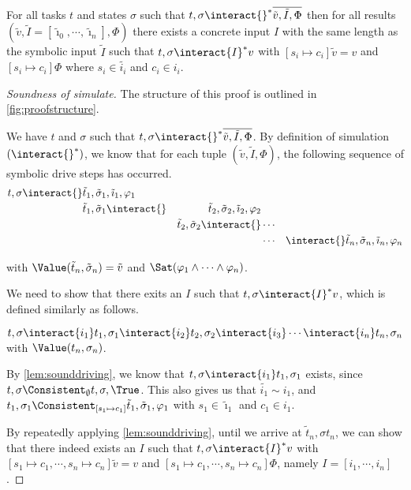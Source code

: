 \begin{lemma}
  \label{lem:soundsimulate}
  For all tasks $t$ and states $\sigma$
  such that $t,\sigma\interact{}^*\overline{\tilde{v},\tilde{I},\Phi}$
  then for all results $(\tilde{v},\tilde{I}=[\tilde{\imath}_0,\cdots,\tilde{\imath}_n],\Phi)$
  there exists a concrete input $I$ with the same length as the symbolic input $\tilde{I}$
  such that $t,\sigma\interact{I}^*v$
  with $[s_i\mapsto c_i]\tilde{v}=v$ and $[s_i\mapsto c_i]\Phi$
  where $s_i\in\tilde{i_i}$ and $c_i\in i_i$.
\end{lemma}

\begin{proof}[Soundness of simulate]
  The structure of this proof is outlined in \cref{fig:proofstructure}.

  We have $t$ and $\sigma$ such that $t,\sigma\interact{}^*\overline{\tilde{v},\tilde{I},\Phi}$.
  By definition of simulation $(\interact{}^*)$, we know that for each tuple $(\tilde{v},\tilde{I},\Phi)$,
  the following sequence of symbolic drive steps has occurred.
  \begin{align*}
      t,\sigma\interact{}&\tilde{t}_1,\tilde{\sigma}_1,\tilde{\imath}_1,\phi_1&\\
                      &\tilde{t}_1,\tilde{\sigma}_1\interact{}&\tilde{t}_2,\tilde{\sigma}_2,\tilde{\imath}_2,\phi_2\\
                      &                                    &\tilde{t}_2,\tilde{\sigma}_2\interact{}&\cdots&\\
                      &                                    &                                    &\cdots&
                      \interact{}\tilde{t}_n,\tilde{\sigma}_n,\tilde{\imath}_n,\phi_n
  \end{align*}

  with $\Value(\tilde{t}_n,\tilde{\sigma}_n)=\tilde{v}$ and $\Sat(\phi_1\land\cdots\land\phi_n)$.

  We need to show that there exits an $I$ such that $t,\sigma\interact{I}^*v$, which is defined similarly as follows.

  $t,\sigma\interact{i_1}t_1,\sigma_1\interact{i_2}t_2,\sigma_2\interact{i_3}\cdots \interact{i_n}t_n,\sigma_n$ with $\Value(t_n,\sigma_n)$.

  By \cref{lem:sounddriving}, we know that $t,\sigma\interact{i_1}t_1,\sigma_1$ exists, since $t,\sigma\Consistent_{\emptyset}t,\sigma,\True$.
  This also gives us that $\tilde{i_1}\sim i_1$, and $t_1,\sigma_1\Consistent_{[s_1\mapsto c_1]}\tilde{t}_1,\tilde{\sigma}_1,\phi_1$ with $s_1\in\tilde{\imath}_1$ and $c_1\in i_1$.

  By repeatedly applying \cref{lem:sounddriving}, until we arrive at $\tilde{t}_n,\sigma{t}_n$,
  we can show that there indeed exists an $I$ such that $t,\sigma\interact{I}^*v$ with $[s_1\mapsto c_1,\cdots,s_n\mapsto c_n]\tilde{v}=v$
  and $[s_1\mapsto c_1,\cdots,s_n\mapsto c_n]\Phi$, namely $I=[i_1,\cdots,i_n]$.

\end{proof}

